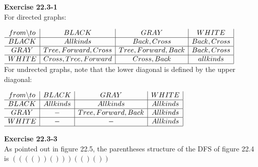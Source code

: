 \documentclass{article}
\begin{document}
\noindent\textbf{Exercise 22.3-1}\\
For directed graphs:

$
\begin{array}{c|c|c|c|}
from\backslash to& BLACK&GRAY&WHITE\\
\hline
BLACK&All kinds& Back, Cross& Back, Cross\\
\hline
GRAY&Tree, Forward, Cross&Tree, Forward, Back&Back, Cross\\
\hline
WHITE&Cross, Tree, Forward&Cross, Back&all kinds\\
\hline
\end{array}
$\\

For undrected graphs, note that the lower diagonal is defined by the upper diagonal:

$
\begin{array}{c|c|c|c|}
from\backslash to& BLACK&GRAY&WHITE\\
\hline
BLACK&All kinds&All kinds&All kinds\\
\hline
GRAY&-&Tree, Forward, Back&All kinds\\
\hline
WHITE&-&-&All kinds\\
\hline
\end{array}
$


\noindent\textbf{Exercise 22.3-3}\\
As pointed out in figure 22.5, the parentheses structure of the DFS of figure 22.4 is $(((())()))(()())$\\
\end{document}
